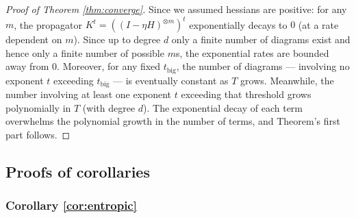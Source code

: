 \documentclass[anon,12pt]{colt2021} %
\newcommand{\pr}{\prime}
\newcommand{\wrap}[1]{\left(#1\right)}
\begin{document}
{        %

        \begin{proof}[Proof of Theorem \ref{thm:converge}]
            Since we assumed hessians are positive: for any $m$, the propagator
            $K^t = \wrap{(I-\eta H)^{\otimes m}}^t$ exponentially decays to $0$
            (at a rate dependent on $m$).  Since up to degree $d$ only a finite
            number of diagrams exist and hence only a finite number of possible
            $m$s, the exponential rates are bounded away from $0$.  Moreover,
            for any fixed $t_{\text{big}}$, the number of diagrams ---
            involving no exponent $t$ exceeding $t_{\text{big}}$ --- is
            eventually constant as $T$ grows.  Meanwhile, the number involving
            at least one exponent $t$ exceeding that threshold grows
            polynomially in $T$ (with degree $d$).  The exponential decay of
            each term overwhelms the polynomial growth in the number of terms,
            and Theorem's first part follows.
        \end{proof}


    \subsection{Proofs of corollaries}                              \label{appendix:corollaries}

        \subsubsection{Corollary \ref{cor:entropic}}

}
\end{document}
